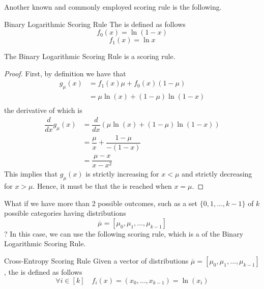 \documentclass[a4paper, 12pt]{report}
\begin{document}
    Another known and commonly employed scoring rule is the following.

    \begin{frameddefn}{Binary Logarithmic Scoring Rule}
        The  is defined as follows $$f_0(x) = \ln(1 - x)$$ $$f_1(x) = \ln x$$
    \end{frameddefn}

    \begin{framedthm}{}
        The Binary Logarithmic Scoring Rule is a scoring rule.
    \end{framedthm}
    
    \begin{proof}
        First, by definition we have that
        \begin{equation*}
            \begin{split}
                g_\mu(x) &= f_1(x)\mu + f_0(x)(1 - \mu) \\
                         &= \mu \ln(x) + (1 - \mu) \ln(1 - x) \\
            \end{split}
        \end{equation*}
        the derivative of which is
        \begin{equation*}
            \begin{split}
                \dfrac{d}{dx}{g_\mu(x)} &= \dfrac{d}{dx}(\mu \ln(x) + (1 - \mu) \ln(1 - x)) \\
                                        &= \dfrac{\mu}{x} + \dfrac{1 - \mu}{ - ( 1 - x)} \\
                                        &= \dfrac{\mu - x}{x - x^2}
            \end{split}
        \end{equation*}
        This implies that $g_\mu(x)$ is strictly increasing for $x < \mu$ and strictly decreasing for $x > \mu$. Hence, it must be that the  is reached when $x = \mu$.
    \end{proof}

    What if we have more than 2 possible outcomes, such as a set $\{0, 1, \ldots, k - 1\}$ of $k$ possible categories having distributions $$\overline \mu = [\mu_0, \mu_1, \ldots, \mu_{k - 1}]$$? In this case, we can use the following scoring rule, which is a  of the Binary Logarithmic Scoring Rule.

    \begin{frameddefn}{Cross-Entropy Scoring Rule}
        Given a vector of distributions $\overline \mu = [\mu_0, \mu_1, \ldots, \mu_{k - 1}]$, the  is defined as follows $$\forall i \in [k] \quad f_i(x) = (x_0, \ldots, x_{k - 1}) = \ln(x_i)$$
    \end{frameddefn}
\end{document}
